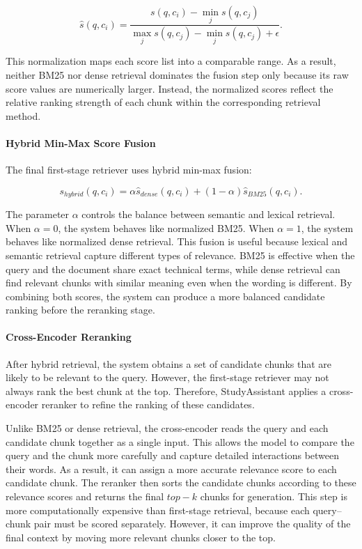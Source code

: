 \documentclass[11pt,a4paper]{article}
\begin{document}
\[
\hat{s}(q,c_i) =
\frac{s(q,c_i) - \min_j s(q,c_j)}
{\max_j s(q,c_j) - \min_j s(q,c_j) + \epsilon}.
\]

This normalization maps each score list into a comparable range. As a result,
neither BM25 nor dense retrieval dominates the fusion step only because its raw
score values are numerically larger. Instead, the normalized scores reflect the
relative ranking strength of each chunk within the corresponding retrieval
method.

\paragraph{Hybrid Min-Max Score Fusion}

The final first-stage retriever uses hybrid min-max fusion:

\[
    s_{hybrid}(q,c_i) =
    \alpha \hat{s}_{dense}(q,c_i)
    +
    (1-\alpha)\hat{s}_{BM25}(q,c_i).
\]

The parameter $\alpha$ controls the balance between semantic and lexical
retrieval. When $\alpha=0$, the system behaves like normalized BM25. When
$\alpha=1$, the system behaves like normalized dense retrieval. This fusion is useful because lexical and semantic retrieval capture different
types of relevance. BM25 is effective when the query and the document share
exact technical terms, while dense retrieval can find relevant chunks with
similar meaning even when the wording is different. By combining both scores,
the system can produce a more balanced candidate ranking before the reranking
stage.

\paragraph{Cross-Encoder Reranking}

After hybrid retrieval, the system obtains a set of candidate chunks that are
likely to be relevant to the query. However, the first-stage retriever may not
always rank the best chunk at the top. Therefore, StudyAssistant applies a
cross-encoder reranker to refine the ranking of these candidates.

Unlike BM25 or dense retrieval, the cross-encoder reads the query and each
candidate chunk together as a single input. This allows the model to compare
the query and the chunk more carefully and capture detailed interactions between
their words. As a result, it can assign a more accurate relevance score to each
candidate chunk.
The reranker then sorts the candidate chunks according to these relevance
scores and returns the final $top-k$ chunks for generation. This step is more
computationally expensive than first-stage retrieval, because each query--chunk
pair must be scored separately. However, it can improve the quality of the final
context by moving more relevant chunks closer to the top.
\end{document}
